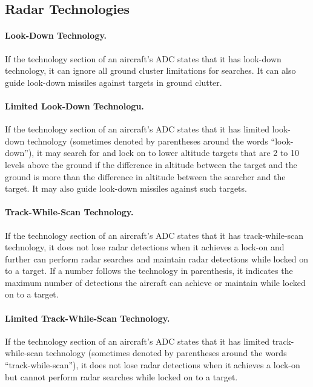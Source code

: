 \begin{advancedrules}
{\section{Radar Technologies}

\paragraph{Look-Down Technology.} \label{rule:look-down-missiles}
If the technology section of an aircraft’s ADC states that it has look-down technology, it can ignore all ground cluster limitations for searches. It can also guide look-down missiles against targets in ground clutter.

\paragraph{Limited Look-Down Technologu.} If the technology section of an aircraft’s ADC states that it has limited look-down technology (sometimes denoted by parentheses around the words “look-down”), it may search for and lock on to lower altitude targets that are 2 to 10 levels above the ground if the difference in altitude between the target and the ground is more than the difference in altitude between the searcher and the target. It may also guide look-down missiles against such targets.


\paragraph{Track-While-Scan Technology.} If the technology section of an aircraft’s ADC states that it has track-while-scan technology, it does not lose radar detections when it achieves a lock-on and further can perform radar searches and maintain radar detections while locked on to a target.
If a number follows the technology in parenthesis, it indicates the maximum number of detections the aircraft can achieve or maintain while locked on to a target.


\paragraph{Limited Track-While-Scan Technology.} If the technology section of an aircraft’s ADC states that it has limited track-while-scan technology (sometimes denoted by parentheses around the words “track-while-scan”), it does not lose radar detections when it achieves a lock-on but cannot perform radar searches while locked on to a target.

}
\end{advancedrules}
